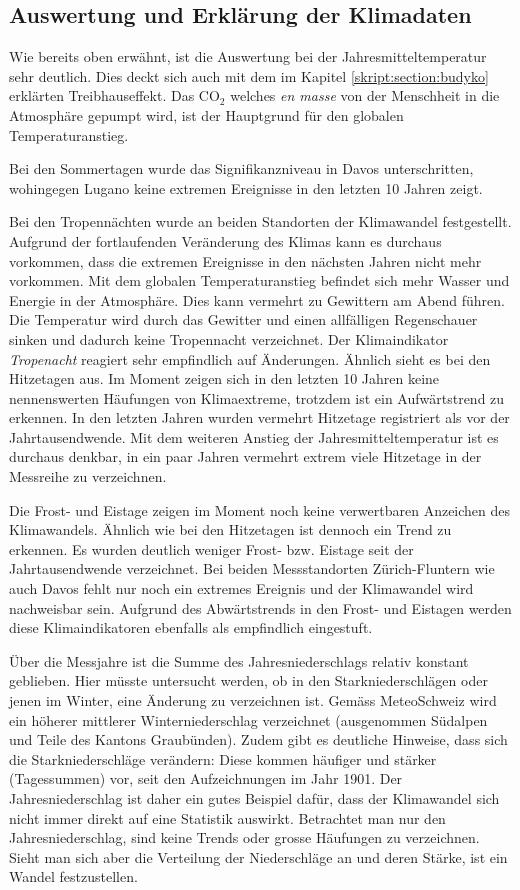 \begin{refsection}
\subsection{Auswertung und Erklärung der Klimadaten}
Wie bereits oben erwähnt, ist die Auswertung bei der Jahresmitteltemperatur sehr deutlich.  Dies deckt sich auch mit dem im Kapitel \ref{skript:section:budyko} erklärten Treibhauseffekt. Das CO$_2$ welches \textit{en masse} von der Menschheit in die Atmosphäre gepumpt wird, ist der Hauptgrund für den globalen Temperaturanstieg.

Bei den Sommertagen wurde das Signifikanzniveau in Davos unterschritten, wohingegen Lugano keine extremen Ereignisse in den letzten 10 Jahren zeigt. 

Bei den Tropennächten wurde an beiden Standorten der Klimawandel festgestellt. Aufgrund der fortlaufenden Veränderung des Klimas kann es durchaus vorkommen, dass die extremen Ereignisse in den nächsten Jahren nicht mehr vorkommen. Mit dem globalen Temperaturanstieg befindet sich mehr Wasser und Energie in der Atmosphäre. Dies kann vermehrt zu Gewittern am Abend führen. Die Temperatur wird durch das Gewitter und einen allfälligen Regenschauer sinken und dadurch keine Tropennacht verzeichnet. Der Klimaindikator \textit{Tropenacht} reagiert sehr empfindlich auf Änderungen.
%
Ähnlich sieht es bei den Hitzetagen aus. Im Moment zeigen sich in den letzten 10 Jahren keine nennenswerten Häufungen von Klimaextreme, trotzdem ist ein Aufwärtstrend zu erkennen. In den letzten Jahren wurden vermehrt Hitzetage registriert als vor der Jahrtausendwende. Mit dem weiteren Anstieg der Jahresmitteltemperatur ist es durchaus denkbar, in ein paar Jahren vermehrt extrem viele Hitzetage in der Messreihe zu verzeichnen.

Die Frost- und Eistage zeigen im Moment noch keine verwertbaren Anzeichen des Klimawandels. Ähnlich wie bei den Hitzetagen ist dennoch ein Trend zu erkennen. Es wurden deutlich weniger Frost- bzw. Eistage seit der Jahrtausendwende verzeichnet. Bei beiden Messstandorten Zürich-Fluntern wie auch Davos fehlt nur noch ein extremes Ereignis und der Klimawandel wird nachweisbar sein. Aufgrund des Abwärtstrends in den Frost- und Eistagen werden diese Klimaindikatoren ebenfalls als empfindlich eingestuft.

Über die Messjahre ist die Summe des Jahresniederschlags relativ konstant geblieben. Hier müsste untersucht werden, ob in den Starkniederschlägen oder jenen im Winter, eine Änderung zu verzeichnen ist. Gemäss MeteoSchweiz wird ein höherer mittlerer Winterniederschlag verzeichnet (ausgenommen Südalpen und Teile des Kantons Graubünden). Zudem gibt es deutliche Hinweise, dass sich die Starkniederschläge verändern: Diese kommen häufiger und stärker (Tagessummen) vor, seit den Aufzeichnungen im Jahr 1901. Der Jahresniederschlag ist daher ein gutes Beispiel dafür, dass der Klimawandel sich nicht immer direkt auf eine Statistik auswirkt. Betrachtet man nur den Jahresniederschlag, sind keine Trends oder grosse Häufungen zu verzeichnen. Sieht man sich aber die Verteilung der Niederschläge an und deren Stärke, ist ein Wandel festzustellen.


\end{refsection}
